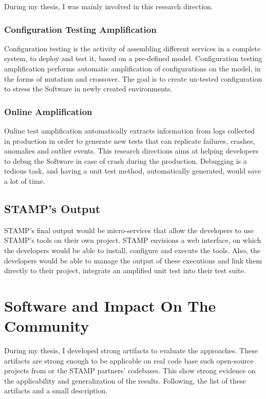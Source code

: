 During my thesis, I was mainly involved in this research direction.

\subsubsection{Configuration Testing Amplification}
\label{subsubsec:intro:research-directions:config-ampl}

Configuration testing is the activity of assembling different services in a complete system, to deploy and test it, based on a pre-defined model.
Configuration testing amplification performs automatic amplification of configurations on the model, in the forms of mutation and crossover.
The goal is to create un-tested configuration to stress the Software in newly created environments.

\subsubsection{Online Amplification}
\label{subsubsec:intro:research-directions:online-ampl}

Online test amplification automatically extracts information from logs collected in production in order to generate new tests that can replicate failures, crashes, anomalies and outlier events.
This research directions aims at helping developers to debug the Software in case of crash during the production.
Debugging is a tedious task, and having a unit test method, automatically generated, would save a lot of time.

\subsection{STAMP's Output}

STAMP's final output would be micro-services that allow the developers to use STAMP's tools on their own project.
STAMP envisions a web interface, on which the developers would be able to install, configure and execute the tools.
Also, the developers would be able to manage the output of these executions and link them directly to their project, \eg integrate an amplified unit test into their test suite.

\section{Software and Impact On The Community}
\label{sec:intro:software}

During my thesis, I developed strong artifacts to evaluate the approaches.
These artifacts are strong enough to be applicable on real code base such open-source projects from \gh or the STAMP partners' codebases.
This show strong evidence on the applicability and generalization of the results.
Following, the list of these artifacts and a small description.


